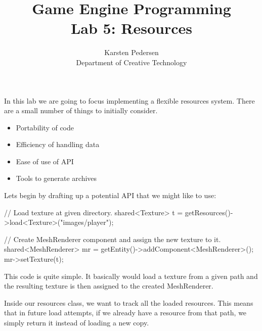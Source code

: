 \documentclass[10pt]{article}
\begin{document}
\title{Game Engine Programming \\
  \large Lab 5: Resources}

\author{Karsten Pedersen\\ Department of Creative Technology}
\maketitle

In this lab we are going to focus implementing a flexible resources system.
There are a small number of things to initially consider.

\begin{itemize}
\item Portability of code
\item Efficiency of handling data
\item Ease of use of API
\item Tools to generate archives
\end{itemize}

Lets begin by drafting up a potential API that we might like to use:

\begin{Code}

// Load texture at given directory.
shared<Texture> t = getResources()->load<Texture>("images/player");

// Create MeshRenderer component and assign the new texture to it.
shared<MeshRenderer> mr = getEntity()->addComponent<MeshRenderer>();
mr->setTexture(t);

\end{Code}

This code is quite simple. It basically would load a texture from a given path
and the resulting texture is then assigned to the created MeshRenderer.


Inside our resources class, we want to track all the loaded
resources. This means that in future load attempts, if we already have
a resource from that path, we simply return it instead of loading a
new copy.
\end{document}
